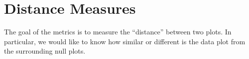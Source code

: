 \documentclass[12pt]{article}\usepackage[]{graphicx}\usepackage[]{color}
\begin{document}


\section{Distance Measures}\label{sec:dists}
The goal of the metrics is to measure the ``distance'' between two plots. In particular, we would like to know how similar or different is the data plot from the surrounding null plots. 
\end{document}
